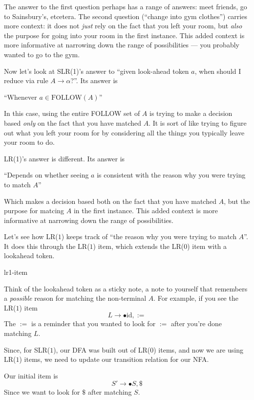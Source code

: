 The answer to the first question perhaps has a range of answers: meet friends, go to Sainsbury's, etcetera. The second question (``change into gym clothes'') carries more context: it does not \textit{just} rely on the fact that you left your room, but \textit{also} the purpose for going into your room in the first instance. This added context is more informative at narrowing down the range of possibilities --- you probably wanted to go to the gym. 

Now let's look at SLR(1)'s answer to ``given look-ahead token $a$, when should I reduce via rule $A \to \alpha$?''. Its answer is
\begin{center}
    ``Whenever $a \in \text{FOLLOW}(A)$''
\end{center}
In this case, using the entire FOLLOW set of $A$ is trying to make a decision based \textit{only} on the fact that you have matched $A$. It is sort of like trying to figure out what you left your room for by considering all the things you typically leave your room to do. 

LR(1)'s answer is different. Its answer is
\begin{center}
    ``Depends on whether seeing $a$ is consistent with the reason why you were trying to match $A$''
\end{center}
Which makes a decision based both on the fact that you have matched $A$, but the purpose for matcing $A$ in the first instance. This added context is more informative at narrowing down the range of possibilities. 

Let's see how LR($1$) keeps track of ``the reason why you were trying to match $A$''. It does this through the LR($1$) item, which extends the LR($0$) item with a lookahead token. 

\begin{center}
    {lr1-item}
\end{center}

Think of the lookahead token as a sticky note, a note to yourself that remembers a \textit{possible} reason for matching the non-terminal $A$. For example, if you see the LR($1$) item 
\[L \to \bullet \text{id}, :=\]
The $:=$ is a reminder that you wanted to look for $:=$ after you're done matching $L$. 

Since, for SLR($1$), our DFA was built out of LR($0$) items, and now we are using LR($1$) items, we need to update our transition relation for our NFA. 

Our initial item is
\[S' \to \bullet S, \$\]
Since we want to look for $\$$ after matching $S$. 

